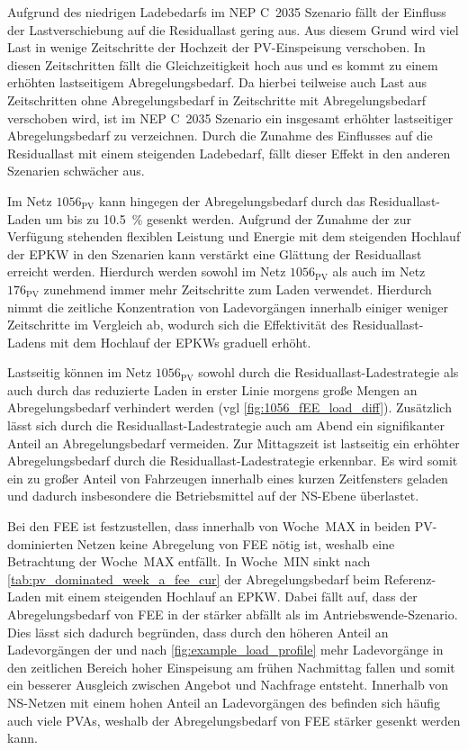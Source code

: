 Aufgrund des niedrigen Ladebedarfs im \gls{NEP} C~\num{2035} Szenario fällt der Einfluss der Lastverschiebung auf die Residuallast gering aus.
Aus diesem Grund wird viel Last in wenige Zeitschritte der Hochzeit der \gls{PV}-Einspeisung verschoben.
In diesen Zeitschritten fällt die Gleichzeitigkeit hoch aus und es kommt zu einem erhöhten lastseitigem Abregelungsbedarf.
Da hierbei teilweise auch Last aus Zeitschritten ohne Abregelungsbedarf in Zeitschritte mit Abregelungsbedarf verschoben wird, ist im \gls{NEP} C~\num{2035} Szenario ein insgesamt erhöhter lastseitiger Abregelungsbedarf zu verzeichnen.
Durch die Zunahme des Einflusses auf die Residuallast mit einem steigenden Ladebedarf, fällt dieser Effekt in den anderen Szenarien schwächer aus.\medskip

Im Netz \(1056_{\text{PV}}\) kann hingegen der Abregelungsbedarf durch das Residuallast-Laden um bis zu \SI{10.5}{\percent} gesenkt werden.
Aufgrund der Zunahme der zur Verfügung stehenden flexiblen Leistung und Energie mit dem steigenden Hochlauf der \gls{EPKW} in den Szenarien kann verstärkt eine Glättung der Residuallast erreicht werden.
Hierdurch werden sowohl im Netz \(1056_{\text{PV}}\) als auch im Netz \(176_{\text{PV}}\) zunehmend immer mehr Zeitschritte zum Laden verwendet.
Hierdurch nimmt die zeitliche Konzentration von Ladevorgängen innerhalb einiger weniger Zeitschritte im Vergleich ab, wodurch sich die Effektivität des Residuallast-Ladens mit dem Hochlauf der \glspl{EPKW} graduell erhöht.\medskip

Lastseitig können im Netz \(1056_{\text{PV}}\) sowohl durch die Residuallast-Ladestrategie als auch durch das reduzierte Laden in erster Linie morgens große Mengen an Abregelungsbedarf verhindert werden (vgl \autoref{fig:1056_fEE_load_diff}).
Zusätzlich lässt sich durch die Residuallast-Ladestrategie auch am Abend ein signifikanter Anteil an Abregelungsbedarf vermeiden.
Zur Mittagszeit ist lastseitig ein erhöhter Abregelungsbedarf durch die Residuallast-Ladestrategie erkennbar.
Es wird somit ein zu großer Anteil von Fahrzeugen innerhalb eines kurzen Zeitfensters geladen und dadurch insbesondere die Betriebsmittel auf der \gls{NS}-Ebene überlastet.



Bei den \gls{FEE} ist festzustellen, dass innerhalb von Woche~MAX in beiden \gls{PV}-dominierten Netzen keine Abregelung von \gls{FEE} nötig ist, weshalb eine Betrachtung der Woche~MAX entfällt.
In Woche~MIN sinkt nach \autoref{tab:pv_dominated_week_a_fee_cur} der Abregelungsbedarf beim Referenz-Laden mit einem steigenden Hochlauf an \gls{EPKW}.
Dabei fällt auf, dass der Abregelungsbedarf von \gls{FEE} in der \SzeFirmenparkplatz stärker abfällt als im Antriebswende-Szenario.
Dies lässt sich dadurch begründen, dass durch den höheren Anteil an Ladevorgängen der \UCs \oeffen und \zH nach \autoref{fig:example_load_profile} mehr Ladevorgänge in den zeitlichen Bereich hoher Einspeisung am frühen Nachmittag fallen und somit ein besserer Ausgleich zwischen Angebot und Nachfrage entsteht.
Innerhalb von \gls{NS}-Netzen mit einem hohen Anteil an Ladevorgängen des \UC \zH befinden sich häufig auch viele \glspl{PVA}, weshalb der Abregelungsbedarf von \gls{FEE} stärker gesenkt werden kann.


